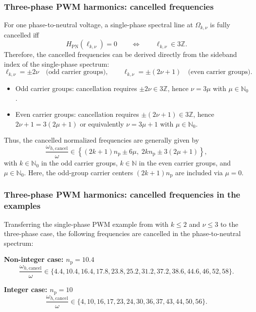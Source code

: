 \begin{frame}
    \frametitle{Three-phase PWM harmonics: cancelled frequencies}
    For one phase-to-neutral voltage, a single-phase spectral line at $\Omega_{k,\nu}$ is fully cancelled iff
    \[
        H_{\mathrm{PN}}(\ell_{k,\nu})=0
        \qquad\Longleftrightarrow\qquad
        \ell_{k,\nu}\in 3\mathbb{Z}.
    \]
    Therefore, the cancelled frequencies can be derived directly from the sideband index of the single-phase spectrum:
    \[
        \ell_{k,\nu}=\pm 2\nu
        \quad\text{(odd carrier groups)},
        \qquad
        \ell_{k,\nu}=\pm(2\nu+1)
        \quad\text{(even carrier groups)}.
    \]
    \begin{itemize}
        \item Odd carrier groups: cancellation requires $\pm 2\nu\in 3\mathbb{Z}$, hence $\nu=3\mu$ with $\mu\in\mathbb{N}_0$.
        \item Even carrier groups: cancellation requires $\pm(2\nu+1)\in 3\mathbb{Z}$, hence $2\nu+1=3(2\mu+1)$ or equivalently $\nu=3\mu+1$ with $\mu\in\mathbb{N}_0$.
    \end{itemize}
    Thus, the cancelled normalized frequencies are generally given by
    \[
        \frac{\omega_{h,\mathrm{cancel}}}{\omega}
        \in
        \left\{
        (2k+1)n_\mathrm{p}\pm 6\mu,
        \; 2kn_\mathrm{p}\pm 3(2\mu+1)
        \right\},
    \]
    with $k\in\mathbb{N}_0$ in the odd carrier groups, $k\in\mathbb{N}$ in the even carrier groups, and $\mu\in\mathbb{N}_0$.
    Here, the odd-group carrier centers $(2k+1)n_\mathrm{p}$ are included via $\mu=0$.
\end{frame}

\begin{frame}
    \frametitle{Three-phase PWM harmonics: cancelled frequencies in the examples}
    Transferring the single-phase PWM example from  with $k\leq 2$ and $\nu\leq 3$ to the three-phase case, the following frequencies are cancelled in the phase-to-neutral spectrum:
    \par\vspace{0.5cm}
    \noindent\textbf{Non-integer case: $n_\mathrm{p}=10.4$}
    \begin{equation*}
        \frac{\omega_{h,\mathrm{cancel}}}{\omega}\in\{4.4,10.4,16.4,17.8,23.8,25.2,31.2,37.2,38.6,44.6,46,52,58\}.
    \end{equation*}
    \par\vspace{0.5cm}
    \noindent\textbf{Integer case: $n_\mathrm{p}=10$}
    \begin{equation*}
        \frac{\omega_{h,\mathrm{cancel}}}{\omega}\in\{4,10,16,17,23,24,30,36,37, 43,44,50,56\}.
    \end{equation*}
\end{frame}

